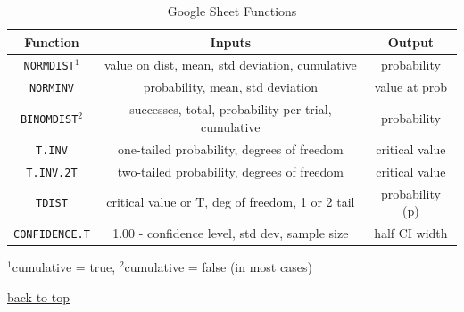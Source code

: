 \documentclass[12pt]{article}
\numberwithin{equation}{section}
\begin{document}
\begin{table}[!ht]
    \centering
    \footnotesize
    \begin{tabular}{c|c c}
        Function                &   Inputs  &   Output \\ \hline
        \verb|NORMDIST|$^1$     &   value on dist, mean, std deviation, cumulative  & probability   \\
        \verb|NORMINV|          &   probability, mean, std deviation            &   value at prob \\
        \verb|BINOMDIST|$^2$    &   successes, total, probability per trial, cumulative   &   probability \\
        \verb|T.INV|            &   one-tailed probability, degrees of freedom  &   critical value \\
        \verb|T.INV.2T|         &   two-tailed probability, degrees of freedom  &   critical value \\
        \verb|TDIST|            &   critical value or T, deg of freedom, 1 or 2 tail    &  probability (p) \\
        \verb|CONFIDENCE.T|     &   1.00 - confidence level, std dev, sample size    &   half CI width \\
    \end{tabular}
    \label{tab:sheet_functions}
    \caption{Google Sheet Functions}
\end{table}
\footnotesize{$^1$cumulative = true, $^2$cumulative = false (in most cases)}


\normalsize
\begin{flushright} \hyperref[sec:top]{back to top} \end{flushright}
\end{document}
